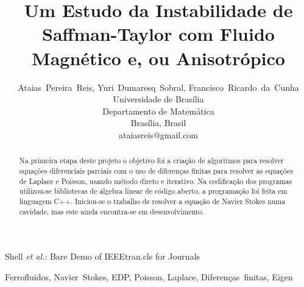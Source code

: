 \documentclass[journal]{IEEEtran}
\begin{document}
\title{Um Estudo da Instabilidade de Saffman-Taylor com Fluido Magnético e, ou Anisotrópico}


\author{Ataias~Pereira~Reis, Yuri~Dumaresq~Sobral, Francisco~Ricardo~da~Cunha\\Universidade de Brasília\\Departamento de Matemática\\Brasília, Brasil\\ataiasreis@gmail.com}

%
{Shell \MakeLowercase{\textit{et al.}}: Bare Demo of IEEEtran.cls for Journals}

\maketitle


\begin{abstract}
Na primeira etapa deste projeto o objetivo foi a criação de algoritmos para resolver equações diferenciais parciais com o uso de diferenças finitas para resolver as equações de Laplace e Poisson, usando método direto e iterativo. Na codificação dos programas utilizou-se bibliotecas de álgebra linear de código aberto, a programação foi feita em linguagem C++. Iniciou-se o trabalho de resolver a equação de Navier Stokes numa cavidade, mas este ainda encontra-se em desenvolvimento. 
\end{abstract}

\begin{IEEEkeywords}
Ferrofluidos, Navier~Stokes, EDP, Poisson, Laplace, Diferenças~finitas, Eigen
\end{IEEEkeywords}
\end{document}
